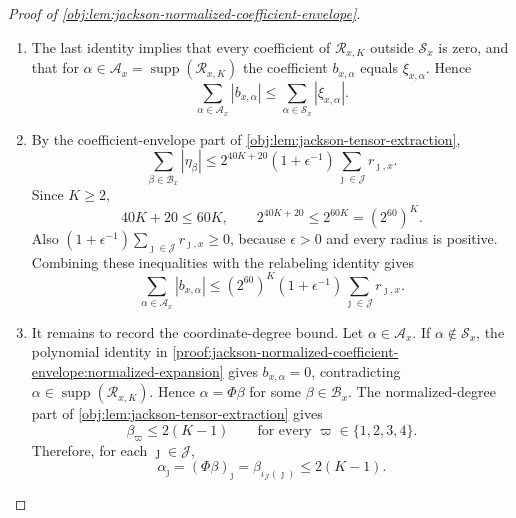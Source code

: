 \begin{proof}[Proof of \cref{obj:lem:jackson-normalized-coefficient-envelope}]
\begin{enumerate}
\item The last identity implies that every coefficient of \(\mathcal R_{x,K}\) outside \(\mathcal S_x\) is zero, and that for \(\alpha\in\mathcal A_x=\operatorname{supp}(\mathcal R_{x,K})\) the coefficient \(b_{x,\alpha}\) equals \(\xi_{x,\alpha}\). Hence
\[
\sum_{\alpha\in\mathcal A_x}|b_{x,\alpha}|
\le
\sum_{\alpha\in\mathcal S_x}|\xi_{x,\alpha}|.
\]

\item By the coefficient-envelope part of \cref{obj:lem:jackson-tensor-extraction},
\[
\sum_{\beta\in\mathcal B_x}|\eta_\beta|
\le
2^{40K+20}(1+\epsilon^{-1})
\sum_{\jmath\in\mathcal J}r_{\jmath,x}.
\]
Since \(K\ge2\),
\[
40K+20\le 60K,
\qquad
2^{40K+20}\le 2^{60K}=(2^{60})^K.
\]
Also \((1+\epsilon^{-1})\sum_{\jmath\in\mathcal J}r_{\jmath,x}\ge0\), because \(\epsilon>0\) and every radius is positive. Combining these inequalities with the relabeling identity gives
\[
\sum_{\alpha\in\mathcal A_x}|b_{x,\alpha}|
\le
(2^{60})^{K}(1+\epsilon^{-1})
\sum_{\jmath\in\mathcal J}r_{\jmath,x}.
\]

\item It remains to record the coordinate-degree bound. Let \(\alpha\in\mathcal A_x\). If \(\alpha\notin\mathcal S_x\), the polynomial identity in \cref{proof:jackson-normalized-coefficient-envelope:normalized-expansion} gives \(b_{x,\alpha}=0\), contradicting \(\alpha\in\operatorname{supp}(\mathcal R_{x,K})\). Hence \(\alpha=\Phi\beta\) for some \(\beta\in\mathcal B_x\). The normalized-degree part of \cref{obj:lem:jackson-tensor-extraction} gives
\[
\beta_\varpi\le 2(K-1)
\qquad\text{for every }\varpi\in\{1,2,3,4\}.
\]
Therefore, for each \(\jmath\in\mathcal J\),
\[
\alpha_\jmath
=
(\Phi\beta)_\jmath
=
\beta_{\iota_{\mathcal J}(\jmath)}
\le
2(K-1).
\]
\end{enumerate}
\end{proof}
